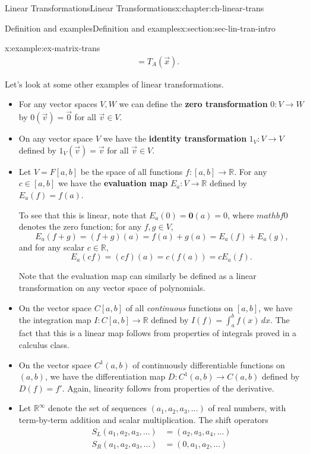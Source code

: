 \documentclass[oneside,10pt,]{book}
\newcommand{\terminology}[1]{\textbf{#1}}
\numberwithin{equation}{section}
\newcommand{\R}{\mathbb{R}}
\newcommand{\amp}{&}
\begin{document}
\begin{chapterptx}{Linear Transformations}{}{Linear Transformations}{}{}{x:chapter:ch-linear-trans}
\begin{sectionptx}{Definition and examples}{}{Definition and examples}{}{}{x:section:sec-lin-tran-intro}
\begin{example}{}{x:example:ex-matrix-trans}
\begin{align*}
\amp = T_A(\vec{x})\text{.}
\end{align*}
%
\end{example}
Let's look at some other examples of linear transformations.%
\begin{itemize}[label=\textbullet]
\item{}For any vector spaces \(V,W\) we can define the \terminology{zero transformation} \(0:V\to W\) by \(0(\vec{v})=\vec{0}\) for all \(\vec{v}\in V\).%
\item{}On any vector space \(V\) we have the \terminology{identity transformation} \(1_V:V\to V\) defined by \(1_V(\vec{v})=\vec{v}\) for all \(\vec{v}\in V\).%
\item{}Let \(V = F[a,b]\) be the space of all functions \(f:[a,b]\to \R\). For any \(c\in [a,b]\) we have the \terminology{evaluation map} \(E_a: V\to \R\) defined by \(E_a(f) = f(a)\).%
\par
To see that this is linear, note that \(E_a(0)=\mathbf{0}(a)=0\), where \(mathbf{0}\) denotes the zero function; for any \(f,g\in V\),%
\begin{equation*}
E_a(f+g)=(f+g)(a)=f(a)+g(a)=E_a(f)+E_a(g)\text{,}
\end{equation*}
and for any scalar \(c\in \R\),%
\begin{equation*}
E_a(cf) = (cf)(a) = c(f(a))=cE_a(f)\text{.}
\end{equation*}
%
\par
Note that the evaluation map can similarly be defined as a linear transformation on any vector space of polynomials.%
\item{}On the vector space \(C[a,b]\) of all \emph{continuous} functions on \([a,b]\), we have the integration map \(I:C[a,b]\to \R\) defined by \(I(f)=\int_a^b f(x)\,dx\). The fact that this is a linear map follows from properties of integrals proved in a calculus class.%
\item{}On the vector space \(C^1(a,b)\) of continuously differentiable functions on \((a,b)\), we have the differentiation map \(D: C^1(a,b)\to C(a,b)\) defined by \(D(f) = f'\). Again, linearity follows from properties of the derivative.%
\item{}Let \(\R^\infty\) denote the set of sequences \((a_1,a_2,a_3,\ldots)\) of real numbers, with term-by-term addition and scalar multiplication. The shift operators%
\begin{align*}
S_L(a_1,a_2,a_3,\ldots)  \amp = (a_2,a_3,a_4,\ldots) \\
S_R(a_1,a_2,a_3,\ldots) \amp = (0,a_1,a_2,\ldots)

\end{align*}
\end{itemize}
\end{sectionptx}
\end{chapterptx}
\end{document}
